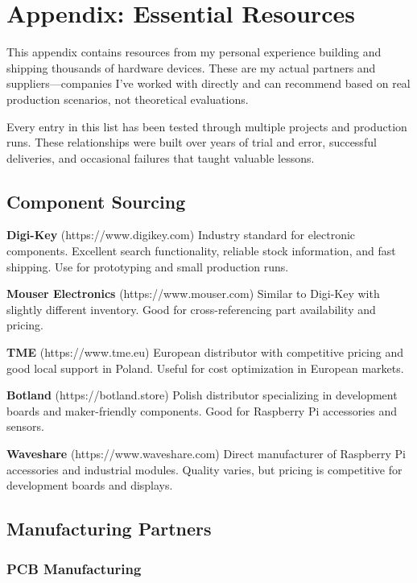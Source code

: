 \chapter*{Appendix: Essential Resources}

This appendix contains resources from my personal experience building and shipping thousands of hardware devices. These are my actual partners and suppliers—companies I've worked with directly and can recommend based on real production scenarios, not theoretical evaluations.

Every entry in this list has been tested through multiple projects and production runs. These relationships were built over years of trial and error, successful deliveries, and occasional failures that taught valuable lessons.

\section{Component Sourcing}

\textbf{Digi-Key} (https://www.digikey.com)
Industry standard for electronic components. Excellent search functionality, reliable stock information, and fast shipping. Use for prototyping and small production runs.

\textbf{Mouser Electronics} (https://www.mouser.com)
Similar to Digi-Key with slightly different inventory. Good for cross-referencing part availability and pricing.

\textbf{TME} (https://www.tme.eu)
European distributor with competitive pricing and good local support in Poland. Useful for cost optimization in European markets.

\textbf{Botland} (https://botland.store)
Polish distributor specializing in development boards and maker-friendly components. Good for Raspberry Pi accessories and sensors.

\textbf{Waveshare} (https://www.waveshare.com)
Direct manufacturer of Raspberry Pi accessories and industrial modules. Quality varies, but pricing is competitive for development boards and displays.

\section{Manufacturing Partners}

\subsection{PCB Manufacturing}

